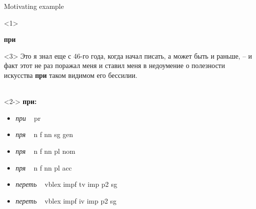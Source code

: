\documentclass{beamer}
\begin{document}
\begin{frame}{Motivating example}

\begin{onlyenv}<1>
\begin{center}
{\LARGE {\bf при}}
\end{center}
\end{onlyenv}

\begin{onlyenv}<3>
Это я знал еще с 46-го года, когда начал писать, а может быть и раньше,
-- и факт этот не раз поражал меня и ставил меня в  недоумение  о  полезности
искусства \textbf{при} таком видимом его бессилии.\\
~\\
\end{onlyenv}
\begin{onlyenv}<2->
\textbf{при:}  \\
\begin{itemize}
\item	\emph{при} ~ pr 
\item	\emph{пря} ~  n f nn sg gen 
\item	\emph{пря} ~  n f nn pl nom 
\item	\emph{пря} ~  n f nn pl acc 
\item	\emph{переть} ~  vblex impf tv imp p2 sg
\item	\emph{переть} ~  vblex impf iv imp p2 sg 
\end{itemize}
\end{onlyenv}
\end{frame}
\end{document}
